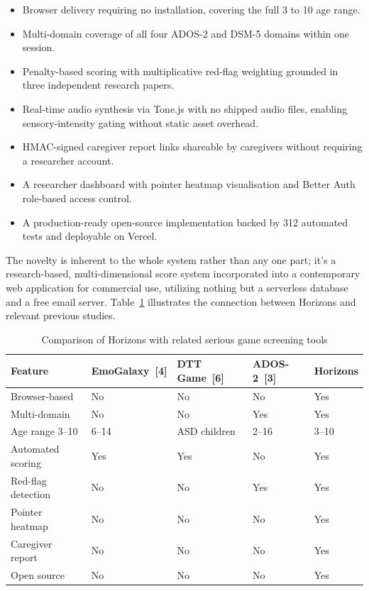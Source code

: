 \documentclass[12pt,a4paper,oneside]{report}
\begin{document}
	\begin{itemize}[leftmargin=0.5in]
		\item Browser delivery requiring no installation, covering the full 3 to 10 age range.
		\item Multi-domain coverage of all four ADOS-2 and DSM-5 domains within one session.
		\item Penalty-based scoring with multiplicative red-flag weighting grounded in three independent research papers.
		\item Real-time audio synthesis via Tone.js with no shipped audio files, enabling sensory-intensity gating without static asset overhead.
		\item HMAC-signed caregiver report links shareable by caregivers without requiring a researcher account.
		\item A researcher dashboard with pointer heatmap visualisation and Better Auth role-based access control.
		\item A production-ready open-source implementation backed by 312 automated tests and deployable on Vercel.
	\end{itemize}
	
	The novelty is inherent to the whole system rather than any one part; it’s a research-based, multi-dimensional score system incorporated into a contemporary web application for commercial use, utilizing nothing but a serverless database and a free email server. Table~\ref{tab:novelty} illustrates the connection between Horizons and relevant previous studies.
	
	\begin{table}[t]
		\caption{Comparison of Horizons with related serious game screening tools}
		\label{tab:novelty}
		\begin{tabularx}{\linewidth}{lXXXX}
			\toprule
			\textbf{Feature} & \textbf{EmoGalaxy~[4]} & \textbf{DTT Game~[6]} & \textbf{ADOS-2~[3]} & \textbf{Horizons} \\
			\midrule
			Browser-based        & No     & No     & No     & Yes    \\
			Multi-domain         & No     & No     & Yes    & Yes    \\
			Age range 3--10      & 6--14  & ASD children & 2--16 & 3--10 \\
			Automated scoring    & Yes    & Yes    & No     & Yes    \\
			Red-flag detection   & No     & No     & Yes    & Yes    \\
			Pointer heatmap      & No     & No     & No     & Yes    \\
			Caregiver report     & No     & No     & No     & Yes    \\
			Open source          & No     & No     & No     & Yes    \\
			\bottomrule
		\end{tabularx}
	\end{table}
	
\end{document}
